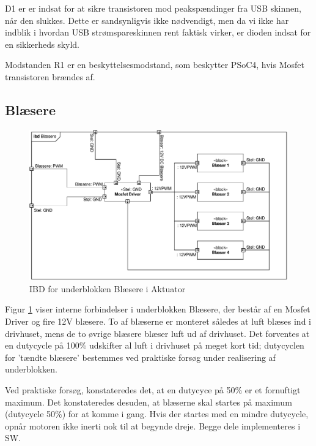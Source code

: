 D1 er er indsat for at sikre transistoren mod peakspændinger fra USB skinnen, når den slukkes. Dette er sandsynligvis ikke nødvendigt, men da vi ikke har indblik i hvordan USB strømspareskinnen rent faktisk virker, er dioden indsat for en sikkerheds skyld. 

Modstanden R1 er en beskyttelsesmodstand, som beskytter PSoC4, hvis Mosfet transistoren brændes af. 

\clearpage


\subsection{Blæsere}

\begin{figure}[h]
\centering 
\includegraphics[width={\textwidth}, trim=0 0 0 0, clip=true] {../fig/ibd_blaesere.pdf}
\caption{IBD for underblokken Blæsere i Aktuator}
\label{fig:ibd_blaesere}
\end{figure}

Figur \ref{fig:ibd_blaesere} viser interne forbindelser i underblokken Blæsere, der består af en Mosfet Driver og fire 12V blæsere. 
To af blæserne er monteret således at luft blæses ind i drivhuset, mens de to øvrige blæsere blæser luft ud af drivhuset. 
Det forventes at en dutycycle på 100\% udskifter al luft i drivhuset på meget kort tid; dutycyclen for 'tændte blæsere' bestemmes ved praktiske forsøg under realisering af underblokken. 

Ved praktiske forsøg, konstateredes det, at en dutycyce på 50\% er et fornuftigt maximum. Det konstateredes desuden, at blæserne skal startes på maximum (dutycycle 50\%) for at komme i gang. 
Hvis der startes med en mindre dutycycle, opnår motoren ikke inerti nok til at begynde dreje. 
Begge dele implementeres i SW. 

